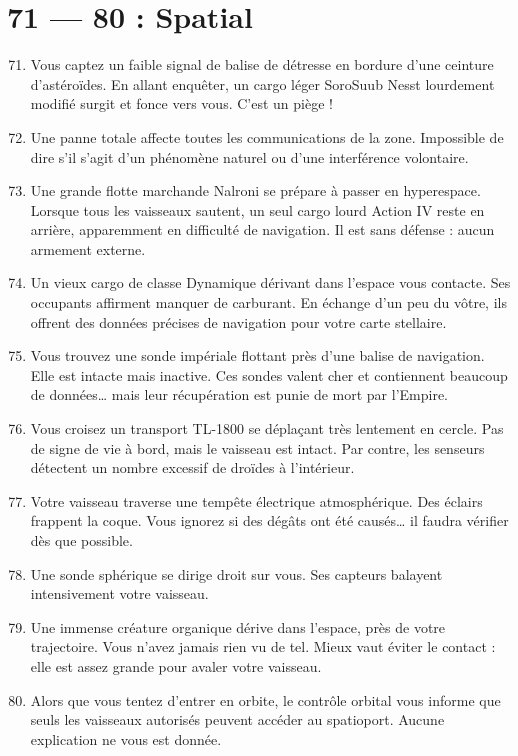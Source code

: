 \documentclass{article}
\begin{document}
\section*{71 --- 80 : Spatial}
\begin{enumerate}
	\setcounter{enumi}{70}

	\item Vous captez un faible signal de balise de détresse en bordure d’une ceinture d’astéroïdes. En allant enquêter, un cargo léger SoroSuub Nesst lourdement modifié surgit et fonce vers vous. C’est un piège !
	\item Une panne totale affecte toutes les communications de la zone. Impossible de dire s’il s’agit d’un phénomène naturel ou d’une interférence volontaire.
	\item Une grande flotte marchande Nalroni se prépare à passer en hyperespace. Lorsque tous les vaisseaux sautent, un seul cargo lourd Action IV reste en arrière, apparemment en difficulté de navigation. Il est sans défense : aucun armement externe.
	\item Un vieux cargo de classe Dynamique dérivant dans l’espace vous contacte. Ses occupants affirment manquer de carburant. En échange d’un peu du vôtre, ils offrent des données précises de navigation pour votre carte stellaire.
	\item Vous trouvez une sonde impériale flottant près d’une balise de navigation. Elle est intacte mais inactive. Ces sondes valent cher et contiennent beaucoup de données… mais leur récupération est punie de mort par l’Empire.
	\item Vous croisez un transport TL-1800 se déplaçant très lentement en cercle. Pas de signe de vie à bord, mais le vaisseau est intact. Par contre, les senseurs détectent un nombre excessif de droïdes à l’intérieur.
	\item Votre vaisseau traverse une tempête électrique atmosphérique. Des éclairs frappent la coque. Vous ignorez si des dégâts ont été causés… il faudra vérifier dès que possible.
	\item Une sonde sphérique se dirige droit sur vous. Ses capteurs balayent intensivement votre vaisseau.
	\item Une immense créature organique dérive dans l’espace, près de votre trajectoire. Vous n’avez jamais rien vu de tel. Mieux vaut éviter le contact : elle est assez grande pour avaler votre vaisseau.
	\item Alors que vous tentez d’entrer en orbite, le contrôle orbital vous informe que seuls les vaisseaux autorisés peuvent accéder au spatioport. Aucune explication ne vous est donnée.
\end{enumerate}
\end{document}
